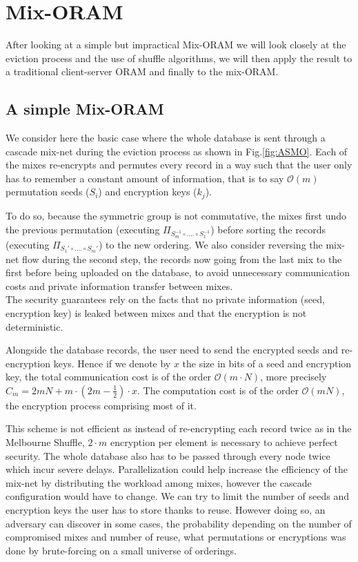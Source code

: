 \documentclass{llncs}
\begin{document}
\section{Mix-ORAM}\label{Mix-ORAM}
After looking at a simple but impractical Mix-ORAM we will look closely at the eviction process and the use of shuffle algorithms, we will then apply the result to a traditional client-server ORAM and finally to the mix-ORAM.
%
\subsection{A simple Mix-ORAM}\label{SMO}
%
We consider here the basic case where the whole database is sent through a cascade mix-net during the eviction process as shown in Fig.\ref{fig:ASMO}.
Each of the mixes re-encrypts and permutes every record in a way such that the user only has to remember a constant amount of information, that is to say $\mathcal{O}\left ( m \right )$ permutation seeds ($S_i$) and encryption keys ($k_j$).

To do so, because the symmetric group is not commutative, the mixes first undo the previous permutation (executing $\Pi_{S_m^{-1} \circ .... \circ S_1^{-1}}$) before sorting the records (executing $\Pi_{S_1' \circ .... \circ S_m'}$) to the new ordering. We also consider reversing the mix-net flow during the second step, the records now going from the last mix to the first before being uploaded on the database, to avoid unnecessary communication costs and private information transfer between mixes.\\
The security guarantees rely on the facts that no private information (seed, encryption key) is leaked between mixes and that the encryption is not deterministic.

Alongside the database records, the user need to send the encrypted seeds and re-encryption keys. Hence if we denote by $x$ the size in bits of a seed and encryption key, the total communication cost is of the order $\mathcal{O}\left ( m\cdot N \right )$, more precisely $C_m=2mN + m\cdot(2m-\frac{1}{2})\cdot x$.
The computation cost is of the order $\mathcal{O}\left(mN\right)$, the encryption process comprising most of it.

This scheme is not efficient as instead of re-encrypting each record twice as in the Melbourne Shuffle, $2\cdot m$ encryption per element is necessary to achieve perfect security. The whole database also has to be passed through every node twice which incur severe delays. Parallelization could help increase the efficiency of the mix-net by distributing the workload among mixes, however the cascade configuration would have to change.
We can try to limit the number of seeds and encryption keys the user has to store thanks to reuse. However doing so, an adversary can discover in some cases, the probability depending on the number of compromised mixes and number of reuse, what permutations or encryptions was done by brute-forcing on a small universe of orderings.
\end{document}
